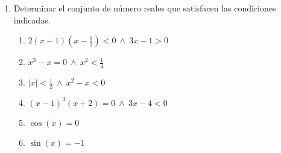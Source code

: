 \documentclass[a4paper]{article}
\newcommand{\exercise}{\item}
\newcommand{\df}[2]{\displaystyle\frac{#1}{#2}}
\begin{document}
\begin{enumerate}
\begin{multicols}{2}
\begin{enumerate} [label=(\alph*)]
	\end{enumerate}
	\end{multicols}

	\exercise Determinar el conjunto de número reales que satisfacen las condiciones indicadas.
	\begin{multicols}{2}
	\begin{enumerate} [label=(\alph*)]
		\item $2(x-1)\left(x-\df{1}{2}\right)<0 ~ \land ~ 3x-1>0$
		\item $x^3-x=0 ~ \land ~ x^2<\df{1}{4}$
		\item $|x|<\df{1}{2} ~ \land ~ x^2-x<0$
		\item $(x-1)^3(x+2)=0 ~ \land ~ 3x-4<0$
		\item $\cos(x)=0$
		\item $\sin(x)=-1$

	\end{enumerate}
	\end{multicols}

\end{enumerate}
\end{document}
